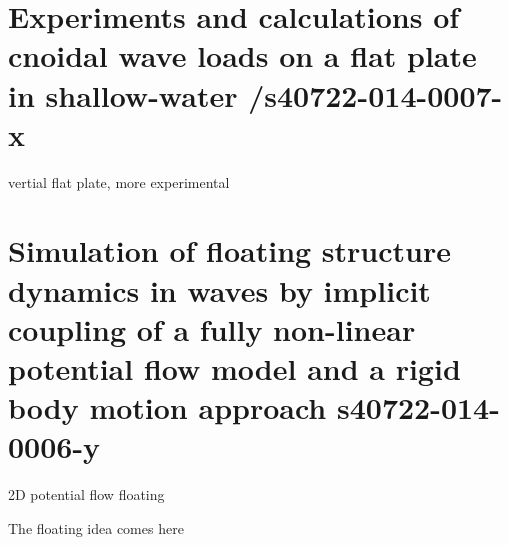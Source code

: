\documentclass[a4paper,12pt]{article} %
\begin{document}
\section{Experiments and calculations of cnoidal wave loads on a flat plate
in shallow-water /s40722-014-0007-x}
vertial flat plate, more experimental

\section{Simulation of floating structure dynamics in waves by implicit
coupling of a fully non-linear potential flow model and a rigid
body motion approach s40722-014-0006-y}
2D potential flow floating

The floating idea comes here
\section{}
\section{}
\section{}
\section{}
\section{}
\section{}
\section{}
\end{document}
